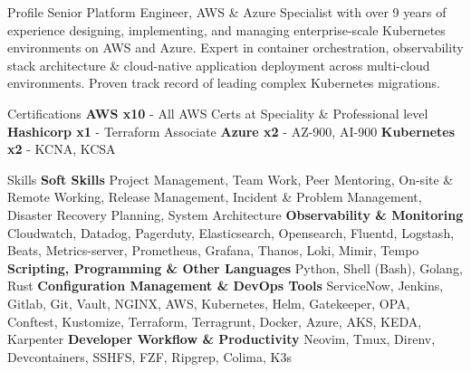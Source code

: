 \documentclass{resume} %
\begin{document}

\begin{rSection}{Profile}
\smallbreak
\normalfont Senior Platform Engineer, AWS \& Azure Specialist with over 9 years of experience designing, implementing,
and managing enterprise-scale Kubernetes environments on AWS and Azure. Expert in container orchestration, observability stack architecture \& cloud-native application deployment across multi-cloud
environments. Proven track record of leading complex Kubernetes migrations.
\end{rSection}


\begin{rSection}{Certifications}
\textbf{AWS x10} - \normalfont All AWS Certs at Speciality \& Professional level \newline
\textbf{Hashicorp x1} - \normalfont Terraform Associate \newline
\textbf{Azure x2} - \normalfont AZ-900, AI-900 \newline
\textbf{Kubernetes x2} - \normalfont KCNA, KCSA
\end{rSection}


\begin{rSection}{Skills}
\smallbreak
{\bf Soft Skills} \newline
Project Management, Team Work, Peer Mentoring, On-site \& Remote Working, Release Management, Incident \& Problem Management, Disaster Recovery Planning, System Architecture \newline
{\bf Observability \& Monitoring} \newline
Cloudwatch, Datadog, Pagerduty, Elasticsearch, Opensearch, Fluentd, Logstash, Beats, Metrics-server, Prometheus, Grafana, Thanos, Loki, Mimir, Tempo \newline
{\bf Scripting, Programming \& Other Languages} \newline
Python, Shell (Bash), Golang, Rust \newline
{\bf Configuration Management \& DevOps Tools} \newline
ServiceNow, Jenkins, Gitlab, Git, Vault, NGINX, AWS, Kubernetes, Helm, Gatekeeper, OPA, Conftest, Kustomize, Terraform, Terragrunt, Docker, Azure, AKS, KEDA, Karpenter \newline
{\bf Developer Workflow \& Productivity} \newline
Neovim, Tmux, Direnv, Devcontainers, SSHFS, FZF, Ripgrep, Colima, K3s
\end{rSection}
\end{document}
